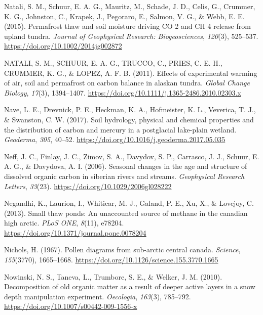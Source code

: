 \documentclass[]{article}
\begin{document}
\leavevmode\hypertarget{ref-Natali_2015}{}%
Natali, S. M., Schuur, E. A. G., Mauritz, M., Schade, J. D., Celis, G.,
Crummer, K. G., Johnston, C., Krapek, J., Pegoraro, E., Salmon, V. G.,
\& Webb, E. E. (2015). Permafrost thaw and soil moisture driving CO 2
and CH 4 release from upland tundra. \emph{Journal of Geophysical
Research: Biogeosciences}, \emph{120}(3), 525--537.
\url{https://doi.org/10.1002/2014jg002872}

\leavevmode\hypertarget{ref-NATALI_2011}{}%
NATALI, S. M., SCHUUR, E. A. G., TRUCCO, C., PRIES, C. E. H., CRUMMER,
K. G., \& LOPEZ, A. F. B. (2011). Effects of experimental warming of
air, soil and permafrost on carbon balance in alaskan tundra.
\emph{Global Change Biology}, \emph{17}(3), 1394--1407.
\url{https://doi.org/10.1111/j.1365-2486.2010.02303.x}

\leavevmode\hypertarget{ref-Nave_2017}{}%
Nave, L. E., Drevnick, P. E., Heckman, K. A., Hofmeister, K. L.,
Veverica, T. J., \& Swanston, C. W. (2017). Soil hydrology, physical and
chemical properties and the distribution of carbon and mercury in a
postglacial lake-plain wetland. \emph{Geoderma}, \emph{305}, 40--52.
\url{https://doi.org/10.1016/j.geoderma.2017.05.035}

\leavevmode\hypertarget{ref-Neff_2006}{}%
Neff, J. C., Finlay, J. C., Zimov, S. A., Davydov, S. P., Carrasco, J.
J., Schuur, E. A. G., \& Davydova, A. I. (2006). Seasonal changes in the
age and structure of dissolved organic carbon in siberian rivers and
streams. \emph{Geophysical Research Letters}, \emph{33}(23).
\url{https://doi.org/10.1029/2006gl028222}

\leavevmode\hypertarget{ref-Negandhi_2013}{}%
Negandhi, K., Laurion, I., Whiticar, M. J., Galand, P. E., Xu, X., \&
Lovejoy, C. (2013). Small thaw ponds: An unaccounted source of methane
in the canadian high arctic. \emph{PLoS ONE}, \emph{8}(11), e78204.
\url{https://doi.org/10.1371/journal.pone.0078204}

\leavevmode\hypertarget{ref-Nichols_1967}{}%
Nichols, H. (1967). Pollen diagrams from sub-arctic central canada.
\emph{Science}, \emph{155}(3770), 1665--1668.
\url{https://doi.org/10.1126/science.155.3770.1665}

\leavevmode\hypertarget{ref-Nowinski_2010}{}%
Nowinski, N. S., Taneva, L., Trumbore, S. E., \& Welker, J. M. (2010).
Decomposition of old organic matter as a result of deeper active layers
in a snow depth manipulation experiment. \emph{Oecologia},
\emph{163}(3), 785--792. \url{https://doi.org/10.1007/s00442-009-1556-x}
\end{document}
